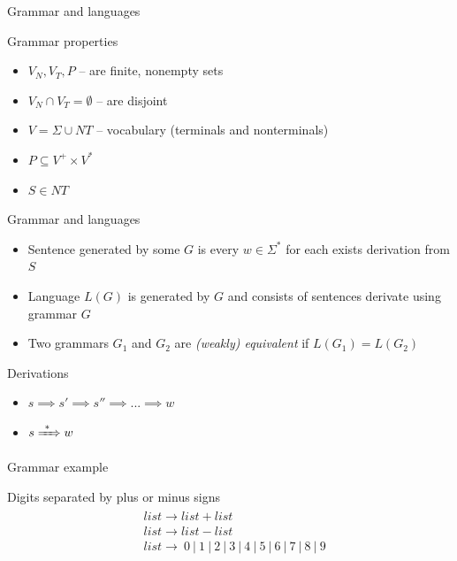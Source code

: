 \documentclass{beamer}
\begin{document}
\begin{frame}{Grammar and languages}

\begin{block}{Grammar properties}
\begin{itemize}
\item $V_N, V_T, P$ -- are finite, nonempty sets
\item $V_N \cap V_T = \emptyset$ -- are disjoint
\item $V = \Sigma \cup NT$ -- vocabulary (terminals and nonterminals)
\item $P \subseteq V^{+} \times V^{\ast}$
\item $S \in NT$
\end{itemize}
\end{block}

\begin{block}{Grammar and languages}
\begin{itemize}
	\item Sentence generated by some $G$ is every $w\in \Sigma^{\ast}$ for each exists derivation from $S$
	\item Language $L(G)$ is generated by $G$ and consists of sentences derivate using grammar $G$
	\item Two grammars $G_1$ and $G_2$ are \textit{(weakly) equivalent} if $L(G_1) = L(G_2)$
\end{itemize}
\end{block}

 \end{frame}
 
 \begin{frame}{Derivations}
 	\begin{itemize}
 		\item $s \implies s' \implies s'' \implies ... \implies w$
 		\item $s \xRightarrow{\ * \ } w$
 	\end{itemize}
 \end{frame}

\begin{frame}{Grammar example}
\begin{examples}{Digits separated by plus or minus signs}
\begin{eqnarray*}
\begin{aligned}
& list \rightarrow list + list \\
& list \rightarrow list - list \\
& list \rightarrow \ 0 \ | \ 1 \ | \ 2 \ | \ 3 \ | \ 4 \ | \ 5 \ | \ 6 \ | \ 7 \ | \ 8 \ | \ 9
\end{aligned}
\end{eqnarray*}
\end{examples}
\end{frame}
\end{document}
